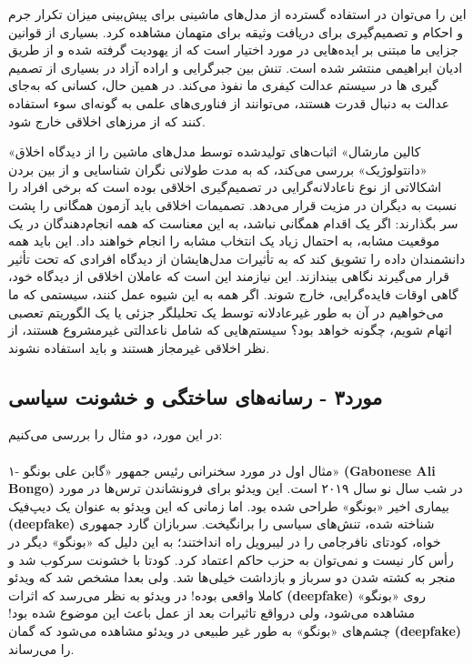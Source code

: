 این را می‌توان در استفاده گسترده از مدل‌های ماشینی برای پیش‌بینی میزان تکرار جرم و احکام و تصمیم‌گیری برای دریافت وثیقه برای متهمان مشاهده کرد.
بسیاری از قوانین جزایی ما مبتنی بر ایده‌هایی در مورد اختیار است که از یهودیت گرفته شده و از طریق ادیان ابراهیمی منتشر شده است.
تنش بین جبرگرایی و اراده آزاد در بسیاری از تصمیم گیری ها در سیستم عدالت کیفری ما نفوذ می‌کند.
در همین حال، کسانی که به‌جای عدالت به دنبال قدرت هستند، می‌توانند از فناوری‌های علمی به گونه‌ای سوء استفاده کنند که از مرزهای اخلاقی خارج شود.

«کالین مارشال» اثبات‌های تولیدشده توسط مدل‌های ماشین را از دیدگاه اخلاق «دانتولوژیک» بررسی می‌کند، که به مدت طولانی نگران شناسایی و از بین بردن اشکالاتی از نوع ناعادلانه‌گرایی در تصمیم‌گیری اخلاقی بوده است که برخی افراد را نسبت به دیگران در مزیت قرار می‌دهد.
تصمیمات اخلاقی باید آزمون همگانی را پشت سر بگذارند: اگر یک اقدام همگانی نباشد، به این معناست که همه انجام‌دهندگان در یک موقعیت مشابه، به احتمال زیاد یک انتخاب مشابه را انجام خواهند داد.
این باید همه دانشمندان داده را تشویق کند که به تأثیرات مدل‌هایشان از دیدگاه افرادی که تحت تأثیر قرار می‌گیرند نگاهی بیندازند.
این نیازمند این است که عاملان اخلاقی از دیدگاه خود، گاهی اوقات فایده‌گرایی، خارج شوند.
اگر همه به این شیوه عمل کنند، سیستمی که ما می‌خواهیم در آن به طور غیرعادلانه توسط یک تحلیلگر جزئی یا یک الگوریتم تعصبی اتهام شویم، چگونه خواهد بود؟ سیستم‌هایی که شامل ناعدالتی غیرمشروع هستند، از نظر اخلاقی غیرمجاز هستند و باید استفاده نشوند.
\newline
\newline

{
\subsection*{مورد۳ - رسانه‌های ساختگی و خشونت سیاسی}
\label{subsec:مورد۳ - رسانه‌های ساختگی و خشونت سیاسی}
در این مورد، دو مثال را بررسی می‌کنیم:
}

\paragraph{}
۱- مثال اول در مورد سخنرانی رئیس جمهور «گابن علی بونگو» \textenglish{\textbf{(Gabonese Ali Bongo)}} در شب سال نو سال ۲۰۱۹ است.
این ویدئو برای فرونشاندن ترس‌ها در مورد بیماری اخیر «بونگو» طراحی شده بود.
اما زمانی که این ویدئو به عنوان یک دیپ‌فیک \textenglish{\textbf{(deepfake)}} شناخته شده، تنش‌های سیاسی را برانگیخت.
سربازان گارد جمهوری خواه، کودتای نافرجامی را در لیبرویل راه انداختند؛ به این دلیل که «بونگو» دیگر در رأس کار نیست و نمی‌توان به حزب حاکم اعتماد کرد.
کودتا با خشونت سرکوب شد و منجر به کشته شدن دو سرباز و بازداشت خیلی‌ها شد.
ولی بعدا مشخص شد که ویدئو کاملا واقعی بوده!
در ویدئو به نظر می‌رسد که اثرات \textenglish{\textbf{(deepfake)}} روی «بونگو» مشاهده می‌شود، ولی درواقع تاثیرات بعد از عمل باعث این موضوع شده بود!
چشم‌های «بونگو» به طور غیر طبیعی در ویدئو مشاهده می‌شود که گمان \textenglish{\textbf{(deepfake)}} را می‌رساند.


